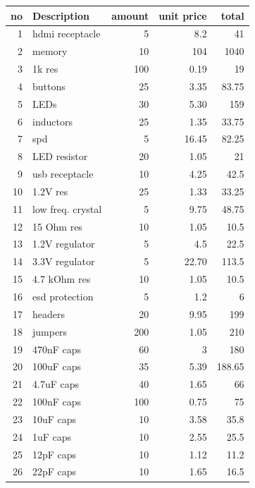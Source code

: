 \documentclass[../main/report.tex]{subfiles}
\begin{document}
\begin{table}[h]
    \begin{tabular}{| r | l | r | r | r |}\hline
        no & Description  & amount & unit price & total \\\hline
        1 & hdmi receptacle  & 5  & 8.2 & 41 \\\hline
        2 & memory  & 10  & 104 & 1040 \\\hline
        3 & 1k res  & 100  & 0.19 & 19 \\\hline
        4 & buttons & 25 & 3.35 & 83.75 \\\hline
        5 & LEDs & 30 & 5.30 & 159 \\\hline
        6 & inductors & 25 & 1.35 & 33.75 \\\hline
        7 & spd & 5 & 16.45 & 82.25 \\\hline
        8 & LED resistor & 20 & 1.05 & 21 \\\hline
        9 & usb receptacle & 10 & 4.25 & 42.5 \\\hline
        10 & 1.2V res & 25 & 1.33 & 33.25 \\\hline
        11 & low freq. crystal & 5 & 9.75 & 48.75 \\\hline
        12 & 15 Ohm res & 10 & 1.05 & 10.5 \\\hline
        13 & 1.2V regulator & 5 & 4.5 & 22.5 \\\hline
        14 & 3.3V regulator & 5 & 22.70 & 113.5 \\\hline
        15 & 4.7 kOhm res & 10 & 1.05 & 10.5 \\\hline
        16 & esd protection & 5 & 1.2 & 6 \\\hline
        17 & headers & 20 & 9.95 & 199 \\\hline
        18 & jumpers & 200 & 1.05 & 210 \\\hline
        19 & 470nF caps & 60 & 3 & 180 \\\hline
        20 & 100uF caps & 35& 5.39 & 188.65 \\\hline
        21 & 4.7uF caps & 40 & 1.65 & 66 \\\hline
        22 & 100nF caps & 100 & 0.75 & 75 \\\hline
        23 & 10uF caps & 10 & 3.58 & 35.8 \\\hline
        24 & 1uF caps & 10 & 2.55 & 25.5  \\\hline
        25 & 12pF caps & 10 & 1.12 & 11.2 \\\hline 
        26 & 22pF caps & 10 & 1.65 & 16.5 \\\hline

\end{tabular}
\end{table}
\end{document}
